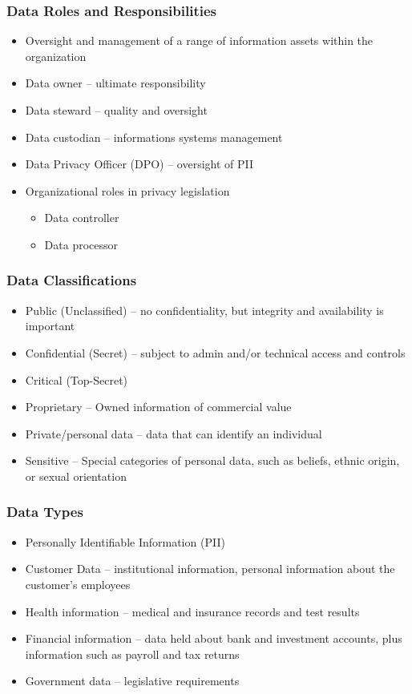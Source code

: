 		\subsubsection {Data Roles and Responsibilities}
			\begin{itemize}
				\item Oversight and management of a range of information assets
					within the organization
				\item Data owner -- ultimate responsibility
				\item Data steward -- quality and oversight
				\item Data custodian -- informations systems management
				\item Data Privacy Officer (DPO) -- oversight of PII
				\item Organizational roles in privacy legislation
					\begin{itemize}
						\item Data controller
						\item Data processor
					\end{itemize}
			\end{itemize}
		\subsubsection {Data Classifications}
			\begin{itemize}
				\item Public (Unclassified) -- no confidentiality, but integrity and
					availability is important
				\item Confidential (Secret) -- subject to admin and/or technical access
					and controls
				\item Critical (Top-Secret)
				\item Proprietary -- Owned information of commercial value
				\item Private/personal data -- data that can identify an individual
				\item Sensitive -- Special categories of personal data, such as beliefs,
					ethnic origin, or sexual orientation
			\end{itemize}
		\subsubsection {Data Types}
			\begin{itemize}
				\item Personally Identifiable Information (PII)
				\item Customer Data -- institutional information, personal information
					about the customer's employees
				\item Health information -- medical and insurance records and test
					results
				\item Financial information -- data held about bank and investment
					accounts, plus information such as payroll and tax returns
				\item Government data -- legislative requirements
			\end{itemize}
